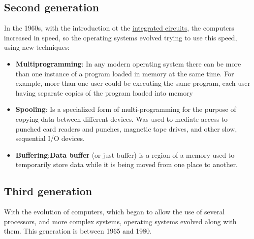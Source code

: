 \subsection{Second generation}
In the 1960s, with the introduction ot the \href{https://en.wikipedia.org/wiki/Integrated_circuit}{integrated circuits}, the computers increased in speed, so the operating systems evolved trying to use this speed, using new techniques:

\begin{itemize}
    \item \textbf{Multiprogramming}: In any modern operating system there can be more than one instance of a program loaded in memory at the same time. For example, more than one user could be executing the same program, each user having separate copies of the program loaded into memory

    \item \textbf{Spooling}: Is a specialized form of multi-programming for the purpose of copying data between different devices. Was used to mediate access to punched card readers and punches, magnetic tape drives, and other slow, sequential I/O devices.

    \item \textbf{Buffering}:\textbf{Data buffer} (or just buffer) is a region of a memory used to temporarily store data while it is being moved from one place to another.
\end{itemize}

\subsection{Third generation}
With the evolution of computers, which began to allow the use of several processors, and more complex systems, operating systems evolved along with them. This generation is between 1965 and 1980.

